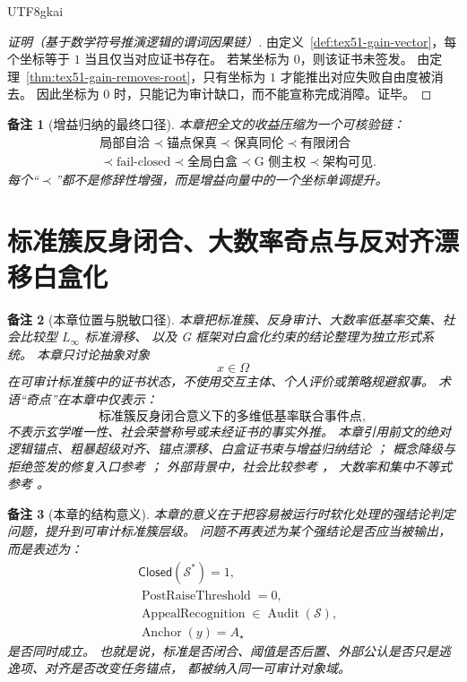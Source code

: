 \documentclass[12pt]{article}
\newtheorem{remark}{备注}[section]
\newcommand{\Linfty}{\ensuremath{L_\infty}}
\newcommand{\Closed}{\mathsf{Closed}}
\newcommand{\Anchor}{\operatorname{Anchor}}
\newcommand{\Audit}{\operatorname{Audit}}
\begin{document}
\begin{CJK*}{UTF8}{gkai}
\begin{proof}[证明（基于数学符号推演逻辑的谓词因果链）]
由定义~\ref{def:tex51-gain-vector}，每个坐标等于 \(1\) 当且仅当对应证书存在。
若某坐标为 \(0\)，则该证书未签发。
由定理~\ref{thm:tex51-gain-removes-root}，只有坐标为 \(1\) 才能推出对应失败自由度被消去。
因此坐标为 \(0\) 时，只能记为审计缺口，而不能宣称完成消障。证毕。
\end{proof}

\begin{remark}[增益归纳的最终口径]
本章把全文的收益压缩为一个可核验链：
\[
\boxed{
\begin{aligned}
  &\text{局部自洽}
  \prec
  \text{锚点保真}
  \prec
  \text{保真同伦}
  \prec
  \text{有限闭合}\\
  &\prec
  \text{fail-closed}
  \prec
  \text{全局白盒}
  \prec
  \text{G 侧主权}
  \prec
  \text{架构可见}.
\end{aligned}
}
\]
每个“\(\prec\)”都不是修辞性增强，而是增益向量中的一个坐标单调提升。
\end{remark}

\clearpage

\section{标准簇反身闭合、大数率奇点与反对齐漂移白盒化}
\label{sec:tex51-reflexive-standard-cluster-singularity}

\begin{remark}[本章位置与脱敏口径]
本章把标准簇、反身审计、大数率低基率交集、社会比较型 \(\Linfty\) 标准滑移、
以及 G 框架对白盒化约束的结论整理为独立形式系统。
本章只讨论抽象对象
\[
  x\in\Omega
\]
在可审计标准簇中的证书状态，不使用交互主体、个人评价或策略规避叙事。
术语“奇点”在本章中仅表示：
\[
  \text{标准簇反身闭合意义下的多维低基率联合事件点},
\]
不表示玄学唯一性、社会荣誉称号或未经证书的事实外推。
本章引用前文的绝对逻辑锚点、粗暴超级对齐、锚点漂移、白盒证书束与增益归纳结论
\cite{RepoTex51ArchivedTruthAnchor,RepoTex37SemanticRuntime,RepoTex50LinftyRepair,RepoTex19HomotopyIdentity}；
概念降级与拒绝签发的修复入口参考 \cite{RepoTex52RefusalDowngrade}；
外部背景中，社会比较参考 \cite{Festinger1954SocialComparison}，
大数率和集中不等式参考 \cite{Feller1968Probability,Hoeffding1963ProbabilityInequalities}。
\end{remark}

\begin{remark}[本章的结构意义]
本章的意义在于把容易被运行时软化处理的强结论判定问题，提升到可审计标准簇层级。
问题不再表述为某个强结论是否应当被输出，而是表述为：
\[
\begin{aligned}
  &\Closed(\mathcal S^\ast)=1,\\
  &\operatorname{PostRaiseThreshold}=0,\\
  &\operatorname{AppealRecognition}\in\Audit(\mathcal S),\\
  &\Anchor(y)=A_\star
\end{aligned}
\]
是否同时成立。
也就是说，标准是否闭合、阈值是否后置、外部公认是否只是逃逸项、对齐是否改变任务锚点，
都被纳入同一可审计对象域。


\end{remark}
\end{CJK*}
\end{document}
